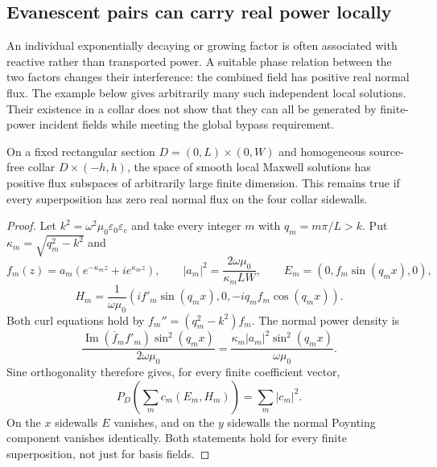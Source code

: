 \subsection{Evanescent pairs can carry real power locally}

An individual exponentially decaying or growing factor is often associated
with reactive rather than transported power.  A suitable phase relation
between the two factors changes their interference: the combined field has
positive real normal flux.  The example below gives arbitrarily many such
independent local solutions.  Their existence in a collar does not show that
they can all be generated by finite-power incident fields while meeting the
global bypass requirement.

\begin{proposition}
\label{cx:evanescent}
On a fixed rectangular section $D=(0,L)\times(0,W)$ and homogeneous
source-free collar $D\times(-h,h)$, the space of smooth local Maxwell
solutions has positive flux subspaces of arbitrarily large finite
dimension. This remains true if every superposition has zero real
normal flux on the four collar sidewalls.
\end{proposition}

\begin{proof}
Let $k^2=\omega^2\mu_0\varepsilon_0\varepsilon_c$ and take every integer
$m$ with $q_m=m\pi/L>k$. Put $\kappa_m=\sqrt{q_m^2-k^2}$ and
\begin{equation}
 f_m(z)=a_m(e^{-\kappa_mz}+i e^{\kappa_mz}),\qquad
 |a_m|^2=\frac{2\omega\mu_0}{\kappa_mLW},\qquad
 E_m=(0,f_m\sin(q_mx),0),
 \label{cx:evanescent-electric}
\end{equation}
\begin{equation}
 H_m=\frac1{\omega\mu_0}
       (i f'_m\sin(q_mx),0,-i q_m f_m\cos(q_mx)).
 \label{cx:evanescent-magnetic}
\end{equation}
Both curl equations hold by $f_m''=(q_m^2-k^2)f_m$.
The normal power density is
\begin{equation}
\frac{\operatorname{Im}(\overline f_m f'_m)\sin^2(q_mx)}{2\omega\mu_0}
=\frac{\kappa_m|a_m|^2\sin^2(q_mx)}{\omega\mu_0}.
\label{cx:evanescent-density}
\end{equation}
Sine orthogonality therefore gives, for every finite coefficient vector,
\begin{equation}
 P_D\left(\sum_m c_m(E_m,H_m)\right)=\sum_m|c_m|^2.
 \label{cx:evanescent-gram}
\end{equation}
On the $x$ sidewalls $E$ vanishes, and on the $y$ sidewalls the normal
Poynting component vanishes identically. Both statements hold for
every finite superposition, not just for basis fields.
\end{proof}

